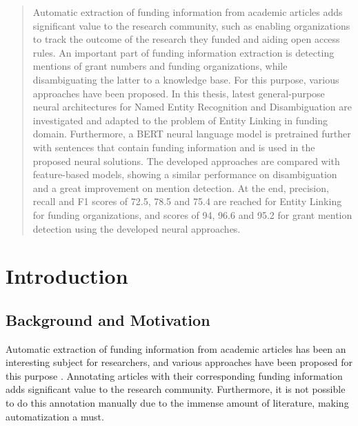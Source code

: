 \documentclass{report}
\theoremstyle{definition}
\theoremstyle{remark}
\begin{document}
\begin{abstract}
Automatic extraction of funding information from academic articles adds significant value to the research community, such as enabling organizations to track the outcome of the research they funded and aiding open access rules. An important part of funding information extraction is detecting mentions of grant numbers and funding organizations, while disambiguating the latter to a knowledge base. For this purpose, various approaches have been proposed. In this thesis, latest general-purpose neural architectures for Named Entity Recognition and Disambiguation are investigated and adapted to the problem of Entity Linking in funding domain. Furthermore, a BERT neural language model is pretrained further with sentences that contain funding information and is used in the proposed neural solutions. The developed approaches are compared with feature-based models, showing a similar performance on disambiguation and a great improvement on mention detection. At the end, precision, recall and F1 scores of 72.5, 78.5 and 75.4 are reached for Entity Linking for funding organizations, and scores of 94, 96.6 and 95.2 for grant mention detection using the developed neural approaches. 
\end{abstract}



\tableofcontents


\chapter{Introduction}
\label{sec:intro}
\section{Background and Motivation}
Automatic extraction of funding information from academic articles has been an interesting subject for researchers, and various approaches have been proposed for this purpose \cite{ElsPaper,AckExtract,GrantExtractor}. Annotating articles with their corresponding funding information adds significant value to the research community. Furthermore, it is not possible to do this annotation manually due to the immense amount of literature, making automatization a must.
\end{document}
